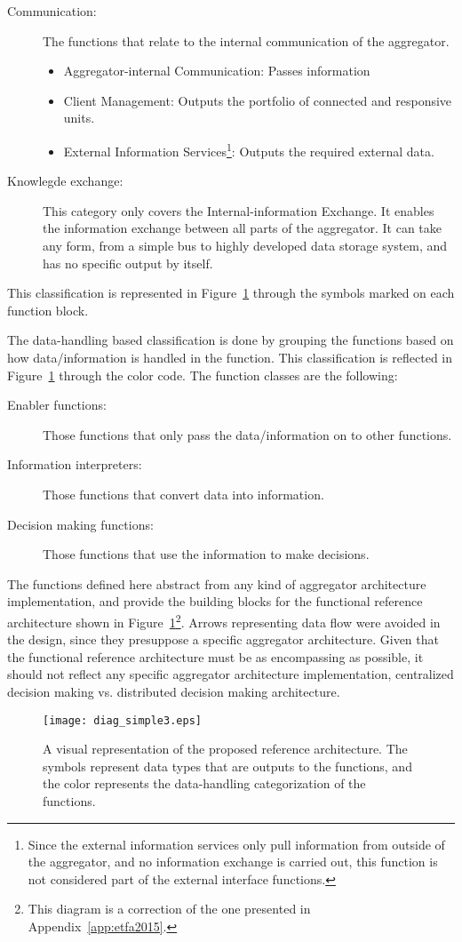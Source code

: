 \begin{description}
\begin{itemize}
		\end{itemize}
	\item[Communication:] The functions that relate to the internal communication of the aggregator.
		\begin{itemize}
			\item Aggregator-internal Communication: Passes information
			\item Client Management: Outputs the portfolio of connected and responsive units.
			\item External Information Services\footnote{Since the external information services only pull information from outside of the aggregator, and no information exchange is carried out, this function is not considered part of the external interface functions.}: Outputs the required external data.
		\end{itemize}
	\item[Knowlegde exchange:] This category only covers the Internal-information Exchange. It enables the information exchange between all parts of the aggregator. It can take any form, from a simple bus to highly developed data storage system, and has no specific output by itself.
\end{description}
This classification is represented in Figure~\ref{fig:MAINrefarch} through the symbols marked on each function block.

The data-handling based classification is done by grouping the functions based on how data/information is handled in the function. This classification is reflected in Figure~\ref{fig:MAINrefarch} through the color code. The function classes are the following:
\begin{description}
	\item[Enabler functions:] Those functions that only pass the data/information on to other functions.
	\item[Information interpreters:] Those functions that convert data into information.
	\item[Decision making functions:] Those functions that use the information to make decisions.
\end{description}

The functions defined here abstract from any kind of aggregator architecture implementation, and provide the building blocks for the functional reference architecture shown in Figure~\ref{fig:MAINrefarch}\footnote{This diagram is a correction of the one presented in Appendix~\ref{app:etfa2015}.}. Arrows representing data flow were avoided in the design, since they presuppose a specific aggregator architecture. Given that the functional reference architecture must be as encompassing as possible, it should not reflect any specific aggregator architecture implementation, \eg centralized decision making vs. distributed decision making architecture. 
\begin{figure}[htb]
\centering
\texttt{[image: diag\_simple3.eps]}
\caption{A visual representation of the proposed reference architecture. The symbols represent data types that are outputs to the functions, and the color represents the data-handling categorization of the functions.}
\label{fig:MAINrefarch}
\end{figure}

